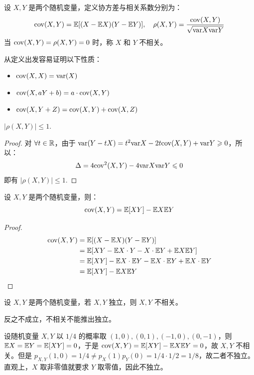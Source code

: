 \begin{definition}[协方差与相关系数]
设 $X,Y$ 是两个随机变量，定义协方差与相关系数分别为：
\[
\mathrm{cov}(X,Y)=\mathbb{E} [(X-\mathbb{E}  X)(Y-\mathbb{E}  Y)],\quad\rho(X,Y)=\frac{\mathrm{cov}(X,Y)}{\sqrt{\mathrm{var} X\mathrm{var} Y}}
\]
当 $\mathrm{cov}(X,Y)=\rho(X,Y)=0$ 时，称 $X$ 和 $Y$ 不相关。
\end{definition}

\begin{property}
从定义出发容易证明以下性质：
\begin{itemize}
    \item $\mathrm{cov}(X,X)=\mathrm{var}(X)$
    \item $\mathrm{cov}(X,aY+b)=a\cdot\mathrm{cov}(X,Y)$ 
    \item $\mathrm{cov}(X,Y+Z)=\mathrm{cov}(X,Y)+\mathrm{cov}(X,Z)$
\end{itemize}
\end{property}

\begin{property}
$|\rho(X,Y)|\leq 1$.
\end{property}
\begin{proof}
对 $\forall t\in \mathbb{R}$，由于 $\mathrm{var}(Y-tX)=t^2\mathrm{var} X-2t\mathrm{cov}(X,Y)+\mathrm{var} Y\geqslant 0$，所以：
\[\Delta=4\mathrm{cov}^2(X,Y)-4\mathrm{var} X\mathrm{var} Y\leqslant 0\]
即有 $|\rho(X,Y)|\leq 1$.
\end{proof}

\begin{theorem}
设 $X,Y$ 是两个随机变量，则：
\[\mathrm{cov}(X,Y)=\mathbb{E}[XY]-\mathbb{E} X\mathbb{E} Y\]
\end{theorem}
\begin{proof}
\begin{align*}
\mathrm{cov}(X,Y)&=\mathbb{E}[(X-\mathbb{E} X)(Y-\mathbb{E} Y)]\\
&=\mathbb{E}[XY-\mathbb{E} X\cdot Y-X\cdot \mathbb{E} Y+\mathbb{E} X\mathbb{E} Y]\\
&=\mathbb{E}[XY]-\mathbb{E} X\cdot\mathbb{E} Y-\mathbb{E} X\cdot\mathbb{E} Y+\mathbb{E} X\cdot\mathbb{E} Y\\
&=\mathbb{E}[XY]-\mathbb{E} X\mathbb{E} Y
\end{align*}
\end{proof}

\begin{corollary}[独立与相关]
设 $X,Y$ 是两个随机变量，若 $X,Y$ 独立，则 $X,Y$ 不相关。
\end{corollary}
\begin{note}
反之不成立，不相关不能推出独立。
\end{note}

\begin{example}[不相关且不独立]
设随机变量 $X,Y$ 以 $1/4$ 的概率取 $(1,0),(0,1),(-1,0),(0,-1)$，则 $\mathbb{E} X=\mathbb{E} Y=\mathbb{E}[XY]=0$，于是 $\mathrm{cov}(X,Y)=\mathbb{E}[XY]-\mathbb{E} X\mathbb{E} Y=0$，故 $X,Y$ 不相关。但是 $p_{X,Y}(1,0)=1/4\neq p_X(1)p_Y(0)=1/4\cdot 1/2=1/8$，故二者不独立。直观上，$X$ 取非零值就要求 $Y$ 取零值，因此不独立。
\end{example}


